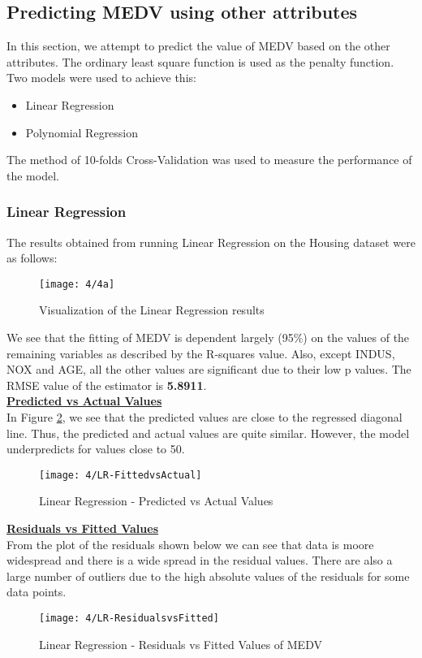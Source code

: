 \documentclass[letterpaper,twocolumn,10pt]{article}
\begin{document}
 \subsection{Predicting MEDV using other attributes}
 In this section, we attempt to predict the value of MEDV based on the other attributes. The ordinary least square function is used as the penalty function. Two models were used to achieve this:
 \begin{itemize}
 \item Linear Regression
 \item Polynomial Regression
 \end{itemize}
 The method of 10-folds Cross-Validation was used to measure the performance of the model.
\subsubsection{Linear Regression}
 The results obtained from running Linear Regression on the Housing dataset were as follows:
\begin{figure}[H]
  \texttt{[image: 4/4a]}
  \caption{Visualization of the Linear Regression results}
  \label{fig:HousingLR}
\end{figure}

We see that the fitting of MEDV is dependent largely (95\%) on the values of the remaining variables as described by the R-squares value. Also, except INDUS, NOX and AGE, all the other values are significant due to their low p values. The RMSE value of the estimator is \textbf{5.8911}.\\
\textbf{\underline{Predicted vs Actual Values}}\\
In Figure \ref{ActFitHouse}, we see that the predicted values are close to the regressed diagonal line. Thus, the predicted and actual values are quite similar. However, the model underpredicts for values close to 50.
\begin{figure}[H]
  \texttt{[image: 4/LR-FittedvsActual]}
  \caption{Linear Regression - Predicted vs Actual Values}
  \label{ActFitHouse}
\end{figure}
\textbf{\underline{Residuals vs Fitted Values}}\\
From the plot of the residuals shown below we can see that data is moore widespread and there is a wide spread in the residual values. There are also a large number of outliers due to the high absolute values of the residuals for some data points.
 \begin{figure}[H]
  \texttt{[image: 4/LR-ResidualsvsFitted]}
  \caption{Linear Regression - Residuals vs Fitted Values of MEDV}
  \label{ResFitHouse}
 \end{figure}
\end{document}
